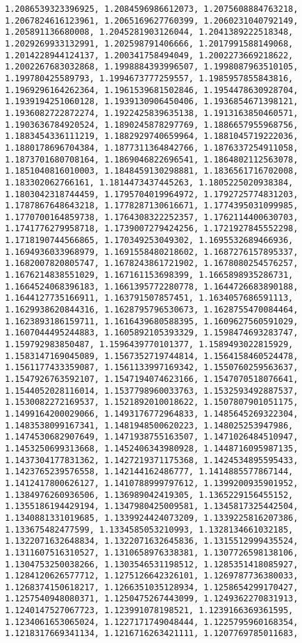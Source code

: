 \documentclass[11pt]{article}
\begin{document}
\begin{Verbatim}[commandchars=\\\{\}]
1.2086539323396925, 1.2084596986612073, 1.2075608884763218, 1.2067824616123961, 1.2065169627760399, 1.2060231040792149, 1.205891136680008, 1.2045281903126044, 1.2041389222518348, 1.2029269933132991, 1.202598791406666, 1.2017991588149068, 1.2014228944124137, 1.200341758494049, 1.2002273669218622, 1.2002267683032868, 1.1998884393996507, 1.1998087963510105, 1.199780425589793, 1.1994673777259557, 1.1985957855843816, 1.1969296164262364, 1.1961539681502846, 1.1954478630928704, 1.1939194251060128, 1.1939130906450406, 1.1936854671398121, 1.1936082722872274, 1.1922425839635138, 1.1913163850460571, 1.1903636784920524, 1.1890245878297769, 1.1886657955968756, 1.1883454336111219, 1.1882929740659964, 1.1881045719222036, 1.1880178696704384, 1.1877311364842766, 1.1876337254911058, 1.1873701680708164, 1.1869046822696541, 1.1864802112563078, 1.1851040816010003, 1.1848459130298881, 1.1836561716702008, 1.183302062766161, 1.1814473437445263, 1.1805225020938384, 1.1803042318744459, 1.1795704019964972, 1.1792725774831203, 1.1787867648643218, 1.1778287130616671, 1.1774395031099985, 1.1770700164859738, 1.1764308322252357, 1.1762114400630703, 1.1741776279958718, 1.1739007279424256, 1.1721927845552298, 1.1718190744566865, 1.170349253049302, 1.1695532689466936, 1.1694936033968979, 1.1691558480218602, 1.1687276157895337, 1.1682007820805747, 1.1678243861721902, 1.1678080254576257, 1.1676214838551029, 1.167161153698399, 1.1665898935286731, 1.1664524068396183, 1.1661395772280778, 1.1644726683890188, 1.1644127735166911, 1.163791507857451, 1.1634057686591113, 1.1629938620844316, 1.1628795796530673, 1.1628755470084464, 1.1623893186159711, 1.1616439680588395, 1.1609627560591029, 1.1607044495244883, 1.1605892105393329, 1.1598474693283747, 1.159792983850487, 1.1596439770101377, 1.1589493022815929, 1.1583147169045089, 1.1567352719744814, 1.1564158460524478, 1.1561177433359087, 1.1561133997169342, 1.1550760259563637, 1.1547926763592107, 1.1547194074623166, 1.1547070518076641, 1.1544052028116014, 1.1537798960033763, 1.1532593492887537, 1.1530082272169537, 1.1521892010018622, 1.1507807901051175, 1.1499164200029066, 1.1493176772964833, 1.1485645269322304, 1.1483538099167341, 1.1481948500620223, 1.148025253947986, 1.1474530682907649, 1.1471938755163507, 1.1471026484510947, 1.1453250699313668, 1.1452406343980928, 1.1448716095987135, 1.1437304177831362, 1.1427219371175368, 1.1424534895595433, 1.1423765239576558, 1.142144162486777, 1.1414885577867144, 1.1412417800626127, 1.1410788999797612, 1.1399200935901952, 1.1384976260936506, 1.136989042419305, 1.1365229156455152, 1.1355186194429194, 1.1347980425009581, 1.1345817325442504, 1.1340881331019685, 1.1339924424073209, 1.1339225816207386, 1.133675482477599, 1.1334585053210993, 1.1328134661032185, 1.1322071632648834, 1.1322071632645836, 1.1315512999435524, 1.1311607516310527, 1.1310658976338381, 1.1307726598138106, 1.1304753250038266, 1.1303546531198512, 1.1285351418085927, 1.1284120626577712, 1.1275126642326101, 1.1269787736380033, 1.1268374150618217, 1.1266351035128934, 1.1258654299170427, 1.1257540948080371, 1.1250475267443099, 1.1249362270831913, 1.1240147527067723, 1.123991078198521, 1.1239166369361595, 1.1234061653065024, 1.1227171749048444, 1.1225795960168354, 1.1218317669341134, 1.1216716263421111, 1.1207769785011683, 
\end{Verbatim}
\end{document}
